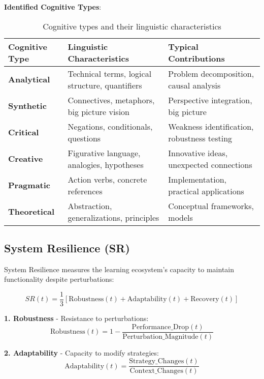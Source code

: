 \textbf{Identified Cognitive Types}:

\begin{table}[h]
	\centering
	\caption{Cognitive types and their linguistic characteristics}
	\label{tab:cognitive-types}
	\begin{tabular}{p{2.5cm}p{4cm}p{4cm}}
		\toprule
		\textbf{Cognitive Type} & \textbf{Linguistic Characteristics} & \textbf{Typical Contributions} \\
		\midrule
		\textbf{Analytical} & Technical terms, logical structure, quantifiers & Problem decomposition, causal analysis \\
		\hline
		\textbf{Synthetic} & Connectives, metaphors, big picture vision & Perspective integration, big picture \\
		\hline
		\textbf{Critical} & Negations, conditionals, questions & Weakness identification, robustness testing \\
		\hline
		\textbf{Creative} & Figurative language, analogies, hypotheses & Innovative ideas, unexpected connections \\
		\hline
		\textbf{Pragmatic} & Action verbs, concrete references & Implementation, practical applications \\
		\hline
		\textbf{Theoretical} & Abstraction, generalizations, principles & Conceptual frameworks, models \\
		\bottomrule
	\end{tabular}
\end{table}

\newpage

\subsection{System Resilience (SR)}
System Resilience measures the learning ecosystem's capacity to maintain functionality despite perturbations:

\begin{equation}
	SR(t) = \frac{1}{3}[\text{Robustness}(t) + \text{Adaptability}(t) + \text{Recovery}(t)]
	\label{eq:system-resilience}
\end{equation}

\textbf{1. Robustness} - Resistance to perturbations:
\begin{equation}
	\text{Robustness}(t) = 1 - \frac{\text{Performance\_Drop}(t)}{\text{Perturbation\_Magnitude}(t)}
	\label{eq:robustness}
\end{equation}

\textbf{2. Adaptability} - Capacity to modify strategies:
\begin{equation}
	\text{Adaptability}(t) = \frac{\text{Strategy\_Changes}(t)}{\text{Context\_Changes}(t)}
	\label{eq:adaptability}
\end{equation}

